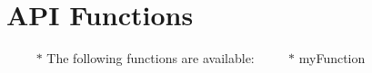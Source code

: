 \chapter{API Functions}
\hypertarget{api_functions}{}\label{api_functions}

\begin{DoxyItemize}
\item {}
\item {}    \texorpdfstring{$\ast$}{*} The following functions are available\+:    \texorpdfstring{$\ast$}{*} my\+Function
\end{DoxyItemize}

   

